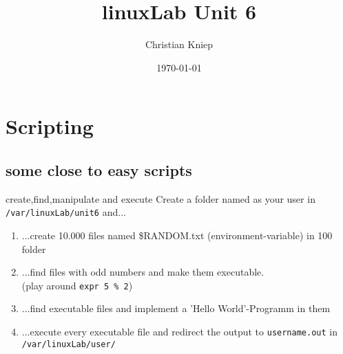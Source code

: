 \documentclass[draft,hyperref={pdfpagelabels=false}]{beamer}
\author{Christian Kniep}
\newcommand{\code}[1]{\colorbox{lGray}{\texttt{#1}}}
\begin{document}
\title{linuxLab Unit 6}
\date[\today]{\today} 

\begin{frame}
	\titlepage
\end{frame} 


\section{Scripting}
    \subsection{some close to easy scripts}
        \begin{frame}{create,find,manipulate and execute}
            Create a folder named as your user in \code{/var/linuxLab/unit6} and...
			\begin{enumerate}
				\item<1-> ...create 10.000 files named \$RANDOM.txt (environment-variable) in 100 folder
                \item<2-> ...find files with odd numbers and make them executable. \\
                            (play around \code{expr 5 \% 2})
                \item<3-> ...find executable files and implement a 'Hello World'-Programm in them
                \item<4-> ...execute every executable file and redirect the output to \code{username.out} in \code{/var/linuxLab/user/}
            \end{enumerate}
		\end{frame}        
\end{document}
